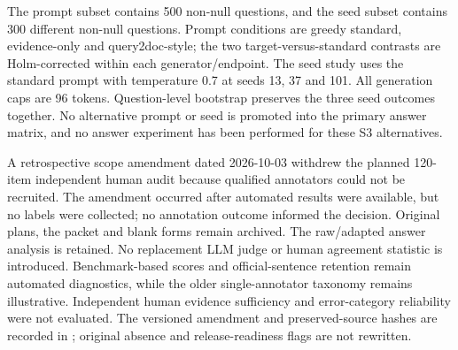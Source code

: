 



\FloatBarrier

The prompt subset contains 500 non-null questions, and the seed subset contains 300 different non-null questions. Prompt conditions are greedy standard, evidence-only and query2doc-style; the two target-versus-standard contrasts are Holm-corrected within each generator/endpoint. The seed study uses the standard prompt with temperature 0.7 at seeds 13, 37 and 101. All generation caps are 96 tokens. Question-level bootstrap preserves the three seed outcomes together. No alternative prompt or seed is promoted into the primary answer matrix, and no answer experiment has been performed for these S3 alternatives.



\FloatBarrier


A retrospective scope amendment dated 2026-10-03 withdrew the planned 120-item independent human audit because qualified annotators could not be recruited. The amendment occurred after automated results were available, but no labels were collected; no annotation outcome informed the decision. Original plans, the packet and blank forms remain archived. The raw/adapted answer analysis is retained. No replacement LLM judge or human agreement statistic is introduced. Benchmark-based scores and official-sentence retention remain automated diagnostics, while the older single-annotator taxonomy remains illustrative. Independent human evidence sufficiency and error-category reliability were not evaluated. The versioned amendment and preserved-source hashes are recorded in ; original absence and release-readiness flags are not rewritten.
\FloatBarrier
